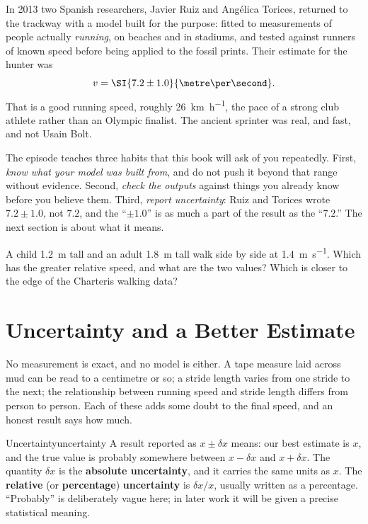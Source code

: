 In 2013 two Spanish researchers, Javier Ruiz and Ang\'elica Torices, returned to the trackway with a model built for the purpose: fitted to measurements of people actually \emph{running}, on beaches and in stadiums, and tested against runners of known speed before being applied to the fossil prints. Their estimate for the hunter was
\[
v = \SI{7.2 \pm 1.0}{\metre\per\second}.
\]
That is a good running speed, roughly \SI{26}{\kilo\metre\per\hour}, the pace of a strong club athlete rather than an Olympic finalist. The ancient sprinter was real, and fast, and not Usain Bolt.

\begin{modelnote}
The episode teaches three habits that this book will ask of you repeatedly. First, \emph{know what your model was built from}, and do not push it beyond that range without evidence. Second, \emph{check the outputs} against things you already know before you believe them. Third, \emph{report uncertainty}: Ruiz and Torices wrote $7.2 \pm 1.0$, not $7.2$, and the ``$\pm 1.0$'' is as much a part of the result as the ``$7.2$.'' The next section is about what it means.
\end{modelnote}

\begin{checkbox}
A child \SI{1.2}{\metre} tall and an adult \SI{1.8}{\metre} tall walk side by side at \SI{1.4}{\metre\per\second}. Which has the greater relative speed, and what are the two values? Which is closer to the edge of the Charteris walking data?
\end{checkbox}

\section{Uncertainty and a Better Estimate}
\label{sec:uncertainty}

No measurement is exact, and no model is either. A tape measure laid across mud can be read to a centimetre or so; a stride length varies from one stride to the next; the relationship between running speed and stride length differs from person to person. Each of these adds some doubt to the final speed, and an honest result says how much.

\begin{definition}{Uncertainty}{uncertainty}
A result reported as $x \pm \delta x$ means: our best estimate is $x$, and the true value is probably somewhere between $x - \delta x$ and $x + \delta x$. The quantity $\delta x$ is the \textbf{absolute uncertainty}, and it carries the same units as $x$. The \textbf{relative} (or \textbf{percentage}) \textbf{uncertainty} is $\delta x / x$, usually written as a percentage. ``Probably'' is deliberately vague here; in later work it will be given a precise statistical meaning.
\end{definition}

